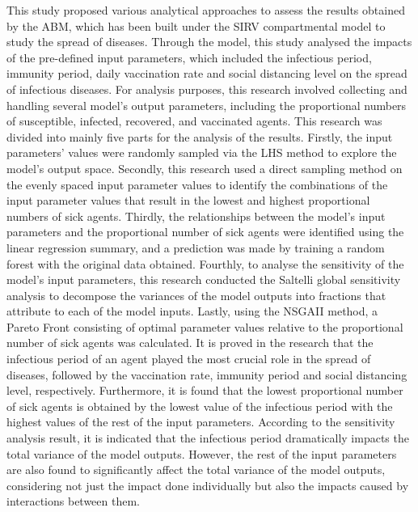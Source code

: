 \documentclass[smallextended]{svjour3}       %
\begin{document}
This study proposed various analytical approaches to assess the results obtained by the ABM, which has been built under the SIRV compartmental model to study the spread of diseases. Through the model, this study analysed the impacts of the pre-defined input parameters, which included the infectious period, immunity period, daily vaccination rate and social distancing level on the spread of infectious diseases. For analysis purposes, this research involved collecting and handling several model’s output parameters, including the proportional numbers of susceptible, infected, recovered, and vaccinated agents.
This research was divided into mainly five parts for the analysis of the results. Firstly, the input parameters’ values were randomly sampled via the LHS method to explore the model’s output space. Secondly, this research used a direct sampling method on the evenly spaced input parameter values to identify the combinations of the input parameter values that result in the lowest and highest proportional numbers of sick agents. Thirdly, the relationships between the model’s input parameters and the proportional number of sick agents were identified using the linear regression summary, and a prediction was made by training a random forest with the original data obtained. Fourthly, to analyse the sensitivity of the model’s input parameters, this research conducted the Saltelli global sensitivity analysis to decompose the variances of the model outputs into fractions that attribute to each of the model inputs. Lastly, using the NSGAII method, a Pareto Front consisting of optimal parameter values relative to the proportional number of sick agents was calculated.
It is proved in the research that the infectious period of an agent played the most crucial role in the spread of diseases, followed by the vaccination rate, immunity period and social distancing level, respectively. Furthermore, it is found that the lowest proportional number of sick agents is obtained by the lowest value of the infectious period with the highest values of the rest of the input parameters. According to the sensitivity analysis result, it is indicated that the infectious period dramatically impacts the total variance of the model outputs. However, the rest of the input parameters are also found to significantly affect the total variance of the model outputs, considering not just the impact done individually but also the impacts caused by interactions between them.
\end{document}
